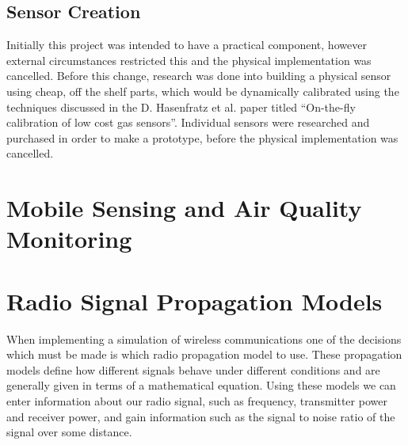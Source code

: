     \subsection{Sensor Creation}

        Initially this project was intended to have a practical component, however external circumstances restricted this and the physical implementation was cancelled. Before this change, research was done into building a physical sensor using cheap, off the shelf parts, which would be dynamically calibrated using the techniques discussed in the D. Hasenfratz et al. paper titled ``On-the-fly calibration of low cost gas sensors''\cite{ontheflycalibration}. Individual sensors were researched and purchased in order to make a prototype, before the physical implementation was cancelled. 
    

\section{Mobile Sensing and Air Quality Monitoring}\label{background_mobile_sensing_models}






\section{Radio Signal Propagation Models}


    When implementing a simulation of wireless communications one of the decisions which must be made is which radio propagation model to use. These propagation models define how different signals behave under different conditions and are generally given in terms of a mathematical equation. Using these models we can enter information about our radio signal, such as frequency, transmitter power and receiver power,  and gain information such as the signal to noise ratio of the signal over some distance.

